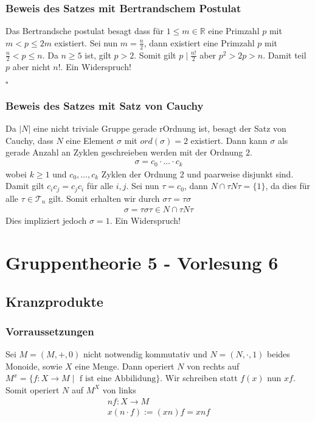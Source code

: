 \documentclass[12pt, german]{article}
\newcommand{\bewiesen}{

\begin{flushright}
		$\square$  \\
\end{flushright}}
\begin{document}
\subsubsection{Beweis des Satzes mit Bertrandschem Postulat}
	Das Bertrandsche postulat besagt dass für $1 \leq m \in \mathbb R$ eine Primzahl $p$ mit $m < p \leq 2m$ existiert. 
	\newline
	Sei nun $m =\frac{n}{2}$, dann existiert eine Primzahl $p$ mit $\frac{n}{2} < p \leq n$. Da $n \geq 5$ ist, gilt $p > 2$. Somit gilt $p \mid \frac{n!}{2}$ aber $p^2 > 2p >  n$. Damit teil $p$ aber nicht $n!$. Ein Widerspruch!
\bewiesen

\subsubsection{Beweis des Satzes mit Satz von Cauchy}
		Da $|N|$ eine nicht triviale Gruppe gerade rOrdnung ist, besagt der Satz von Cauchy, dass $N$ eine Element $\sigma$ mit $ord(\sigma) = 2$ existiert. 
		Dann kann $\sigma$ als gerade Anzahl an Zyklen geschreieben werden mit der Ordnung $2$. 
\begin{align*}
	\sigma = c_0 \cdot \ldots \cdot c_k
\end{align*} 
	wobei $k\geq 1$ und $c_0, \ldots, c_k$ Zyklen der Ordnung $2$ und paarweise disjunkt sind. Damit gilt $c_ic_j = c_jc_i$ für alle $i,j$. 
	Sei nun $\tau = c_0$, dann $N \cap \tau N \tau = \{1\}$, da dies für alle $\tau \in \mathcal T_n$ gilt. Somit erhalten wir durch $\sigma\tau = \tau \sigma$
\begin{align*}
	\sigma = \tau\sigma\tau \in N\cap \tau N \tau
\end{align*} 
	Dies impliziert jedoch $\sigma = 1$. Ein Widerspruch! 

\section{Gruppentheorie 5 - Vorlesung 6}
\subsection{Kranzprodukte}
\subsubsection{Vorraussetzungen}
	Sei $M = (M, +, 0)$ nicht notwendig kommutativ und $N=(N, \cdot, 1)$ beides Monoide, sowie $X$ eine Menge. 
	Dann operiert $N$ von rechts auf $M^x = \{ f: X \to M \mid \text{ f ist eine Abbilidung} \}$. Wir schreiben statt $f(x)$ nun $xf$. 
	Somit operiert $N$ auf $M^X$ von links 
	\begin{align*}
		nf : X \to M \\ 
		x(n\cdot f) := (xn)f = xnf 
	\end{align*}
\end{document}
